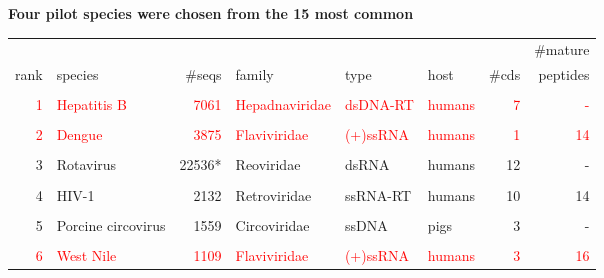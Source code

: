 \documentclass[landscape]{slides}
\begin{document}
\begin{slide}
\begin{center}

\textbf{Four pilot species were chosen from the 15 most common}

\tiny
\begin{tabular}{r|l|r|l|l|l|r|r}
       &                    &              &                &          &        &       & \#mature \\ 
  rank & species            &       \#seqs & family         & type     & host   & \#cds & peptides \\ \hline
       &                    &              &                &          &        &       &          \\ 
\textcolor{red}{1} & \textcolor{red}{Hepatitis B}        &         \textcolor{red}{7061} & \textcolor{red}{Hepadnaviridae} & \textcolor{red}{dsDNA-RT} & \textcolor{red}{humans} &     \textcolor{red}{7} &       \textcolor{red}{-}  \\
       &                    &              &                &          &        &       &          \\ 
\textcolor{red}{2} & \textcolor{red}{Dengue}             &         \textcolor{red}{3875} & \textcolor{red}{Flaviviridae}   & \textcolor{red}{(+)ssRNA} & \textcolor{red}{humans} &     \textcolor{red}{1} &      \textcolor{red}{14}  \\
       &                    &              &                &          &        &       &          \\ 
     3 & Rotavirus          &      22536*  & Reoviridae     & dsRNA    & humans &    12 &       -  \\
       &                    &              &                &          &        &       &          \\ 
     4 & HIV-1              &        2132  & Retroviridae   & ssRNA-RT & humans &    10 &      14  \\
       &                    &              &                &          &        &       &          \\ 
     5 & Porcine circovirus &        1559  & Circoviridae   & ssDNA    & pigs   &     3 &       -  \\
       &                    &              &                &          &        &       &          \\ 
     \textcolor{red}{6} & \textcolor{red}{West Nile}          &        \textcolor{red}{1109} & \textcolor{red}{Flaviviridae}   & \textcolor{red}{(+)ssRNA} & \textcolor{red}{humans} &     \textcolor{red}{3} &      \textcolor{red}{16}  \\

\end{tabular}
\end{center}
\end{slide}
\end{document}
